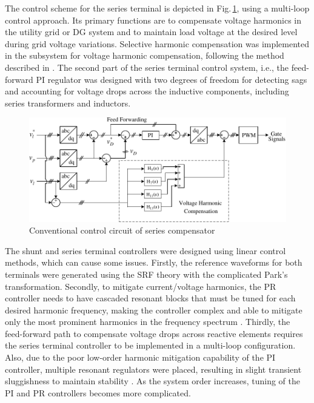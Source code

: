 The control scheme for the series terminal is depicted in Fig.\,\ref{2.Series_control}, using a multi-loop control approach. Its primary functions are to compensate voltage harmonics in the utility grid or DG system and to maintain load voltage at the desired level during grid voltage variations. Selective harmonic compensation was implemented in the subsystem for voltage harmonic compensation, following the method described in \cite{1185456}. The second part of the series terminal control system, i.e., the feed-forward PI regulator was designed with two degrees of freedom for detecting sags and accounting for voltage drops across the inductive components, including series transformers and inductors.
\begin{figure}[ht]
	\centering	
	\includegraphics[scale=0.95]{figures/Chapter_1_2/fig5}
	\caption{Conventional control circuit of series compensator \cite{5713844}}
	\label{2.Series_control}
\end{figure}

The shunt and series terminal controllers were designed using linear control methods, which can cause some issues. Firstly, the reference waveforms for both terminals were generated using the SRF theory with the complicated Park's transformation. Secondly, to mitigate current/voltage harmonics, the PR controller needs to have cascaded resonant blocks that must be tuned for each desired harmonic frequency, making the controller complex and able to mitigate only the most prominent harmonics in the frequency spectrum \cite{IEE-EPA}. Thirdly, the feed-forward path to compensate voltage drops across reactive elements requires the series terminal controller to be implemented in a multi-loop configuration. Also, due to the poor low-order harmonic mitigation capability of the PI controller, multiple resonant regulators were placed, resulting in slight transient sluggishness to maintain stability \cite{5713844}. As the system order increases, tuning of the PI and PR controllers becomes more complicated.

